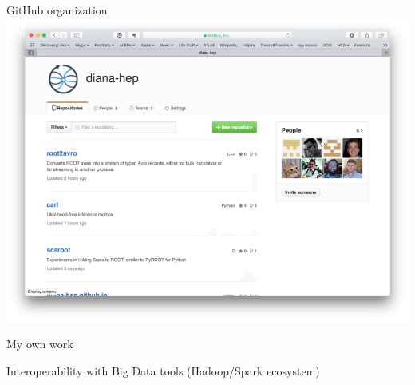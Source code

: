 \documentclass{beamer}
\begin{document}
\begin{frame}{GitHub organization}
\vspace{0.5 cm}
\includegraphics[width=\linewidth]{github_organization.png}
\end{frame}

\begin{frame}{My own work}
\vspace{0.5 cm}
\begin{center}
Interoperability with Big Data tools (Hadoop/Spark ecosystem)
\end{center}
\end{frame}
\end{document}

